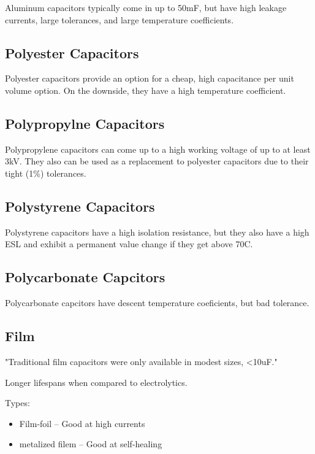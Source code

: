 Aluminum capacitors typically come in up to 50mF, but have high leakage currents, large tolerances, and large temperature coefficients. \cite{learn_caps}

\subsection{Polyester Capacitors}

Polyester capacitors provide an option for a cheap, high capacitance per unit volume option. On the downside, they have a high temperature coefficient. \cite{learn_caps}

\subsection{Polypropylne Capacitors}

Polypropylene capacitors can come up to a high working voltage of up to at least 3kV. They also can be used as a replacement to polyester capacitors due to their tight (1\%) tolerances.\cite{learn_caps}

\subsection{Polystyrene Capacitors}

Polystyrene capacitors have a high isolation resistance, but they also have a high ESL and exhibit a permanent value change if they get above 70C.
\cite{learn_caps}

\subsection{Polycarbonate Capcitors}

Polycarbonate capcitors have descent temperature coeficients, but bad tolerance.  \cite{learn_caps}

\subsection{Film}

"Traditional film capacitors were only available in modest sizes, <10uF."

Longer lifespans when compared to electrolytics.

Types:
\begin{itemize}
    \item Film-foil -- Good at high currents
    \item metalized filem -- Good at self-healing
\end{itemize}

